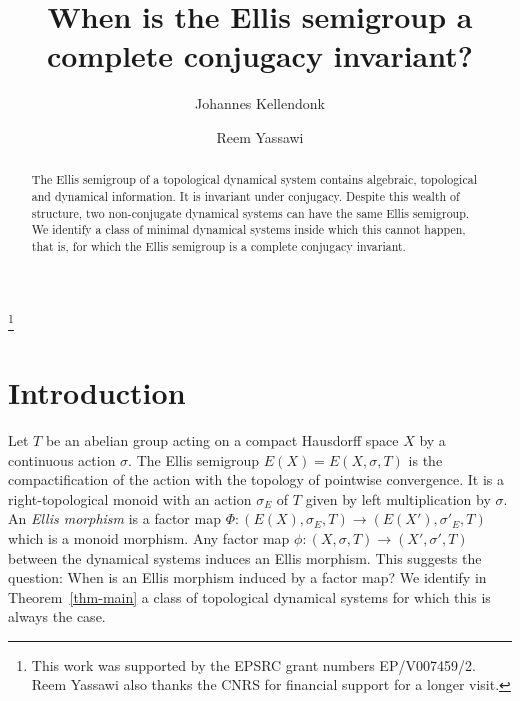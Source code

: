 \documentclass[12pt]{amsart}
\theoremstyle{definition}
\numberwithin{equation}{section}
\begin{document}
\title{When is the Ellis semigroup a complete conjugacy invariant?}
\author{Johannes Kellendonk}
\address{Universit{\'e} Lyon 1, EC Lyon, INSA Lyon, Universit{\'e} Jean Monnet, CNRS, ICJ, UMR 5208, Lyon, France}

\author{Reem Yassawi}
\address{ School of Mathematical Sciences , Queen Mary University of London, U.K.  
}

\thanks{This work was supported by  the
   EPSRC  grant numbers EP/V007459/2. Reem Yassawi also thanks the CNRS for financial support for a longer visit.}








\begin{abstract} 
The Ellis semigroup of a topological dynamical system contains algebraic, topological and dynamical information. 
It is invariant under conjugacy. 
Despite this wealth of structure, two non-conjugate dynamical systems can have the same Ellis semigroup.
We identify a class of minimal dynamical systems inside which this cannot happen, that is, for which the Ellis semigroup is a complete conjugacy invariant.
\end{abstract}

\maketitle




\section{Introduction} {Let $T$ be an abelian group acting on a compact Hausdorff space $X$  by a continuous action $\sigma$. The
   Ellis semigroup $E(X)=E(X, \sigma,T)$ is   the compactification of the action with the topology of pointwise convergence.}
It is a right-topological monoid with an action $\sigma_E$ of $T$ given by left multiplication by $\sigma$. An {\em Ellis morphism}  is a factor map 
$\Phi: (E(X),\sigma_E,T) \rightarrow (E(X'), \sigma'_E,T)$ 
which is a monoid morphism.
Any factor map $\phi:(X, \sigma,T) \rightarrow (X', \sigma',T)$ between the dynamical systems induces an Ellis morphism. This suggests the question:
When is an Ellis morphism induced by 
a factor map? 
We identify in Theorem~\ref{thm-main} a class of topological dynamical systems for which this is always the case. 
\end{document}
